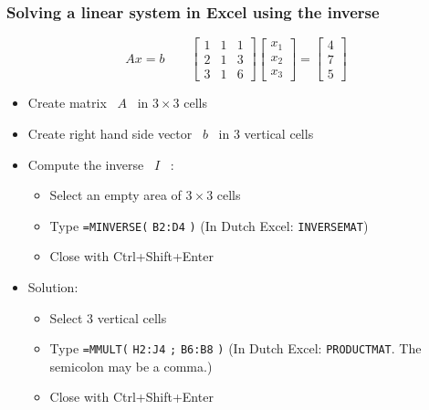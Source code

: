 \begin{frame}[fragile]
  \frametitle{Solving a linear system in Excel using the inverse}\vspace{-1em}
  \[
   Ax=b \qquad \begin{bmatrix}1&1&1\\2&1&3\\3&1&6\end{bmatrix}\begin{bmatrix}x_1\\x_2\\x_3\end{bmatrix}=\begin{bmatrix}4\\7\\5\end{bmatrix}
  \]\vspace{-1em}
  \begin{itemize}
    \item Create matrix \ $A$ \ in $3\times 3$ cells
    \item Create right hand side vector \ $b$ \ in 3 vertical cells\pause
    \item Compute the inverse \ $I$ \ :
    \begin{itemize}
      \item Select an empty area of $3 \times 3$ cells
      \item Type \lstinline$=MINVERSE($
      \lstinline$B2:D4$
      \lstinline$)$ (In Dutch Excel: \lstinline$INVERSEMAT$)
      \item Close with Ctrl+Shift+Enter
    \end{itemize}\pause
    \item Solution:
    \begin{itemize}
      \item Select 3 vertical cells
      \item Type \lstinline$=MMULT($
      \lstinline$H2:J4$
      \lstinline$;$
      \lstinline$B6:B8$
      \lstinline$)$ (In Dutch Excel: \lstinline$PRODUCTMAT$. The semicolon may be a comma.)
      \item Close with Ctrl+Shift+Enter
    \end{itemize}    
  \end{itemize}
\end{frame}


